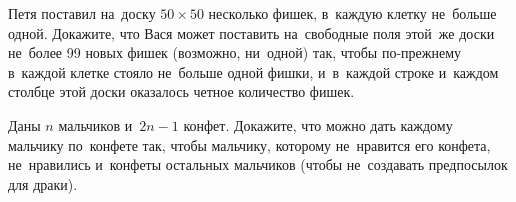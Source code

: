 \begin{problems}
\item
Петя поставил на~доску $50 \times 50$ несколько фишек, в~каждую клетку
не~больше одной.
Докажите, что Вася может поставить на~свободные поля этой~же доски не~более 99
новых фишек (возможно, ни~одной) так, чтобы по-прежнему в~каждой клетке стояло
не~больше одной фишки, и~в~каждой строке и~каждом столбце этой доски оказалось
четное количество фишек.

\item
Даны $n$ мальчиков и~$2 n - 1$ конфет.
Докажите, что можно дать каждому мальчику по~конфете так, чтобы мальчику,
которому не~нравится его конфета, не~нравились и~конфеты остальных мальчиков
(чтобы не~создавать предпосылок для драки).

\end{problems}

